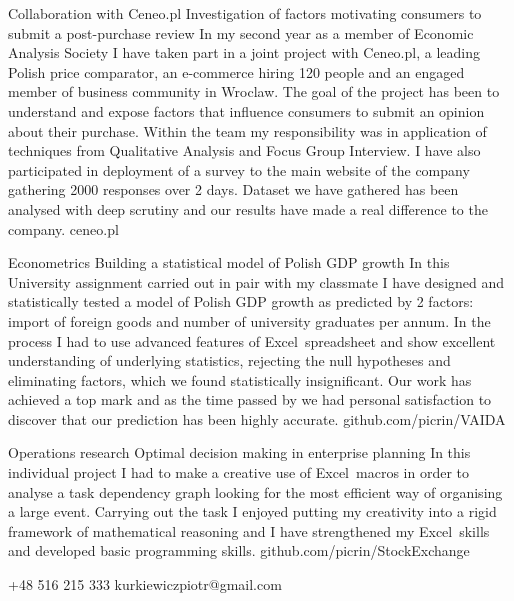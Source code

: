 \documentclass{tccv}
\begin{document}
\begin{eventlist}

\item{Collaboration with Ceneo.pl}
     {Investigation of factors motivating consumers to submit a post-purchase review}
     {In my second year as a member of Economic Analysis Society I have taken part in a joint project with Ceneo.pl, a leading Polish price comparator, an e-commerce hiring 120 people and an engaged member of business community in Wroclaw. The goal of the project has been to understand and expose factors that influence consumers to submit an opinion about their purchase. Within the team my responsibility was in application of techniques from Qualitative Analysis and Focus Group Interview. I have also participated in deployment of a survey to the main website of the company gathering 2000 responses over 2 days. Dataset we have gathered has been analysed with deep scrutiny and our results have made a real difference to the company.}
     {ceneo.pl}

\item{Econometrics}
     {Building a statistical model of Polish GDP growth}
     {In this University assignment carried out in pair with my classmate I have designed and statistically tested a model of Polish GDP growth as predicted by 2 factors: import of foreign goods and number of university graduates per annum. In the process I had to use advanced features of Excel\textregistered\ spreadsheet and show excellent understanding of underlying statistics, rejecting the null hypotheses and eliminating factors, which we found statistically insignificant. Our work has achieved a top mark and as the time passed by we had personal satisfaction to discover that our prediction has been highly accurate.}
     {github.com/picrin/VAIDA}

\item{Operations research}
     {Optimal decision making in enterprise planning}
     {In this individual project I had to make a creative use of Excel\textregistered\ macros in order to analyse a task dependency graph looking for the most efficient way of organising a large event. Carrying out the task I enjoyed putting my creativity into a rigid framework of mathematical reasoning and I have strengthened my Excel\textregistered\ skills and developed basic programming skills.}
     {github.com/picrin/StockExchange}

\end{eventlist}

    {+48 516 215 333}
    {kurkiewiczpiotr@gmail.com}
\end{document}
